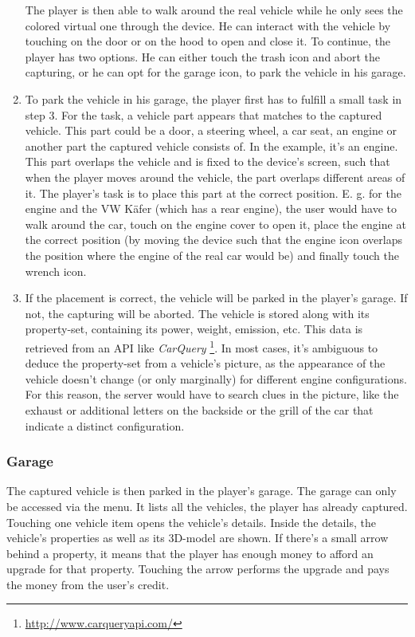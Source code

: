 \begin{enumerate}
The player is then able to walk around the real vehicle while he only sees the colored virtual one through the device. He can interact with the vehicle by touching on the door or on the hood to open and close it. To continue, the player has two options. He can either touch the trash icon and abort the capturing, or he can opt for the garage icon, to park the vehicle in his garage.
  \item To park the vehicle in his garage, the player first has to fulfill a small task in step 3. For the task, a vehicle part appears that matches to the captured vehicle. This part could be a door, a steering wheel, a car seat, an engine or another part the captured vehicle consists of. In the example, it's an engine. This part overlaps the vehicle and is fixed to the device's screen, such that when the player moves around the vehicle, the part overlaps different areas of it. The player's task is to place this part at the correct position. E. g. for the engine and the VW K\"afer (which has a rear engine), the user would have to walk around the car, touch on the engine cover to open it, place the engine at the correct position (by moving the device such that the engine icon overlaps the position where the engine of the real car would be) and finally touch the wrench icon.
  \item If the placement is correct, the vehicle will be parked in the player's garage. If not, the capturing will be aborted. The vehicle is stored along with its property-set, containing its power, weight, emission, etc. This data is retrieved from an API like \emph{CarQuery} \footnote{\url{http://www.carqueryapi.com/}}. In most cases, it's ambiguous to deduce the property-set from a vehicle's picture, as the appearance of the vehicle doesn't change (or only marginally) for different engine configurations. For this reason, the server would have to search clues in the picture, like the exhaust or additional letters on the backside or the grill of the car that indicate a distinct configuration.
\end{enumerate}

\subsubsection{Garage}
The captured vehicle is then parked in the player's garage. The garage can only be accessed via the menu. It lists all the vehicles, the player has already captured. Touching one vehicle item opens the vehicle's details. Inside the details, the vehicle's properties as well as its 3D-model are shown. If there's a small arrow behind a property, it means that the player has enough money to afford an upgrade for that property. Touching the arrow performs the upgrade and pays the money from the user's credit.

